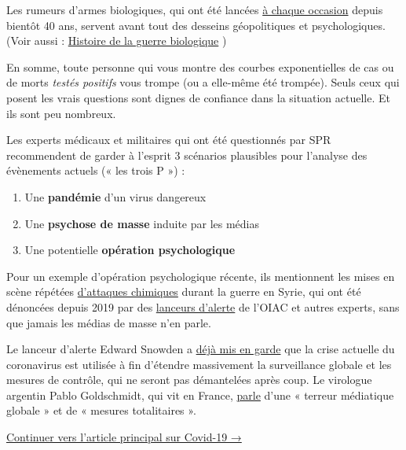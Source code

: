 Les rumeurs d'armes biologiques, qui ont été lancées
\href{https://www.wilsoncenter.org/blog-post/operation-denver-kgb-and-stasi-disinformation-regarding-aids}{à
chaque occasion} depuis bientôt 40 ans, servent avant tout des desseins
géopolitiques et psychologiques. (Voir aussi :
\href{https://www.emedicinehealth.com/biological_warfare/article_em.htm}{Histoire
de la guerre biologique} )

En somme, toute personne qui vous montre des courbes exponentielles de
cas ou de morts \emph{testés positifs} vous trompe (ou a elle-même été
trompée). Seuls ceux qui posent les vrais questions sont dignes de
confiance dans la situation actuelle. Et ils sont peu nombreux.

Les experts médicaux et militaires qui ont été questionnés par SPR
recommendent de garder à l'esprit 3 scénarios plausibles pour l'analyse
des évènements actuels (« les trois P ») :

\begin{enumerate}
\def\labelenumi{\arabic{enumi}.}
\tightlist
\item
  Une \textbf{pandémie} d'un virus dangereux
\item
  Une \textbf{psychose de masse} induite par les médias
\item
  Une potentielle \textbf{opération psychologique}
\end{enumerate}

Pour un exemple d'opération psychologique récente, ils mentionnent les
mises en scène répétées
\href{https://www.globalresearch.ca/the-bbc-saving-syrias-children-documentary-staged-events-fake-video-footage/5470158}{d'attaques
chimiques} durant la guerre en Syrie, qui ont été dénoncées depuis 2019
par des
\href{https://thegrayzone.com/2020/01/22/ian-henderson-opcw-whistleblower-un-no-chemical-attack-douma-syria/}{lanceurs
d'alerte} de l'OIAC et autres experts, sans que jamais les médias de
masse n'en parle.

Le lanceur d'alerte Edward Snowden a
\href{https://www.youtube.com/watch?v=9we6t2nObbw}{déjà mis en garde}
que la crise actuelle du coronavirus est utilisée à fin d'étendre
massivement la surveillance globale et les mesures de contrôle, qui ne
seront pas démantelées après coup. Le virologue argentin Pablo
Goldschmidt, qui vit en France,
\href{https://leblogdejeannesmits.blogspot.com/2020/03/coronavirus-pas-de-raison-de-paralyser.html}{parle}
d'une « terreur médiatique globale » et de « mesures totalitaires ».

\href{https://swprs.org/coronavirus-un-medecin-suisse-parle/}{Continuer
vers l'article principal sur Covid-19 →}

